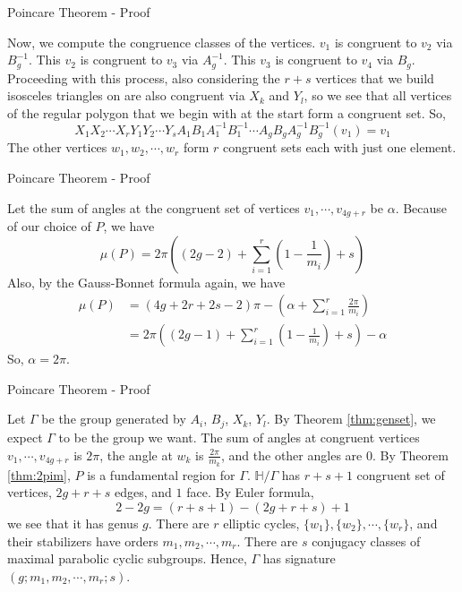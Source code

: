 \documentclass[
	american,
	sections numbered,
	usenames,
	xcolor=dvipsnames,
	aspectratio=169,
]{beamer}
\renewcommand{\H}{\mathbb{H}}
\theoremstyle{plain}%
\begin{document}
\begin{frame}{Poincare Theorem - Proof}

	Now, we compute the congruence classes of the vertices. $v_1$ is congruent to $v_2$ via $B_g^{-1}$. This $v_2$ is congruent to $v_3$ via $A_g^{-1}$. This $v_3$ is congruent to $v_4$ via $B_g$. Proceeding with this process, also considering the $r+s$ vertices that we build isosceles triangles on are also congruent via $X_k$ and $Y_l$, so we see that all vertices of the regular polygon that we begin with at the start form a congruent set. So, $$X_1X_2\cdots X_rY_1Y_2\cdots Y_sA_1B_1A_1^{-1}B_1^{-1}\cdots A_gB_gA_g^{-1}B_g^{-1}(v_1)=v_1$$
    The other vertices $w_1,w_2,\cdots,w_r$ form $r$ congruent sets each with just one element.

\end{frame}

\begin{frame}{Poincare Theorem - Proof}

	Let the sum of angles at the congruent set of vertices $v_1,\cdots,v_{4g+r}$ be $\alpha$. Because of our choice of $P$, we have
    $$\mu(P)=2\pi\left((2g-2)+\sum_{i=1}^r\left(1-\frac{1}{m_i}\right)+s\right)$$
    Also, by the Gauss-Bonnet formula again, we have
    \begin{align*}
        \mu(P) &= (4g+2r+2s-2)\pi-\left(\alpha+\sum_{i=1}^r\frac{2\pi}{m_i}\right)\\
        &= 2\pi\left((2g-1)+\sum_{i=1}^r\left(1-\frac{1}{m_i}\right)+s\right)-\alpha
    \end{align*}
    So, $\alpha=2\pi$.

\end{frame}

\begin{frame}{Poincare Theorem - Proof}

	Let $\Gamma$ be the group generated by $A_i$, $B_j$, $X_k$, $Y_l$. By Theorem \ref{thm:genset}, we expect $\Gamma$ to be the group we want. The sum of angles at congruent vertices $v_1,\cdots,v_{4g+r}$ is $2\pi$, the angle at $w_k$ is $\frac{2\pi}{m_k}$, and the other angles are $0$. By Theorem \ref{thm:2pim}, $P$ is a fundamental region for $\Gamma$. $\H/\Gamma$ has $r+s+1$ congruent set of vertices, $2g+r+s$ edges, and $1$ face. By Euler formula, 
    $$2-2g=(r+s+1)-(2g+r+s)+1$$
    we see that it has genus $g$. There are $r$ elliptic cycles, $\{w_1\},\{w_2\},\cdots,\{w_r\}$, and their stabilizers have orders $m_1,m_2,\cdots,m_r$. There are $s$ conjugacy classes of maximal parabolic cyclic subgroups. Hence, $\Gamma$ has signature $(g;m_1,m_2,\cdots,m_r;s)$.

\end{frame}
\end{document}
